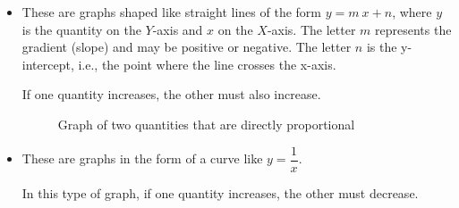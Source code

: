 \begin{enumerate}[label=\numberballmDarkTeal]
        \begin{itemize}
            \item {}
            These are graphs shaped like straight lines of the form \( y = m\ x + n \),
            where \( y \) is the quantity on the \( Y \)-axis and \( x \) on the \( X \)-axis.
            The letter \( m \) represents the gradient (slope) and may be positive or negative.
            The letter \( n \) is the y-intercept, i.e., the point where the line crosses the x-axis.

            \begin{remark}
                If one quantity increases, the other must also increase.
            \end{remark}
            \begin{figure}[H]
                \centering
                \caption{Graph of two quantities that are directly proportional}
            \end{figure}
            \item {}
            These are graphs in the form of a curve like \( y = \dfrac{1}{x} \).

            \begin{remark}
                In this type of graph, if one quantity increases, the other must decrease.
            \end{remark}


\end{itemize}
\end{enumerate}
